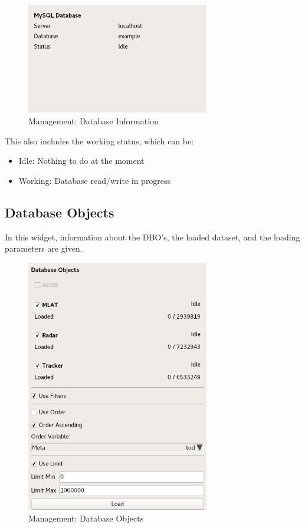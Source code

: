 \documentclass[10pt,letterpaper,extrafontsizes]{memoir}
\begin{document}
\begin{figure}[H]
  \center
    \includegraphics[width=8cm,frame]{../screenshots/management_database.png}
  \caption{Management: Database Information}
  \label{fig:management_database}
\end{figure}

This also includes the working status, which can be:

\begin{itemize}
 \item Idle: Nothing to do at the moment
 \item Working: Database read/write in progress
\end{itemize}

\subsection{Database Objects}
\label{sec:management_dbos}

In this widget, information about the DBO's, the loaded dataset, and the loading parameters are given.

\begin{figure}[H]
  \center
    \includegraphics[width=8cm,frame]{../screenshots/management_dbos.png}
  \caption{Management: Database Objects}
  \label{fig:management_objects}
\end{figure}
\end{document}
